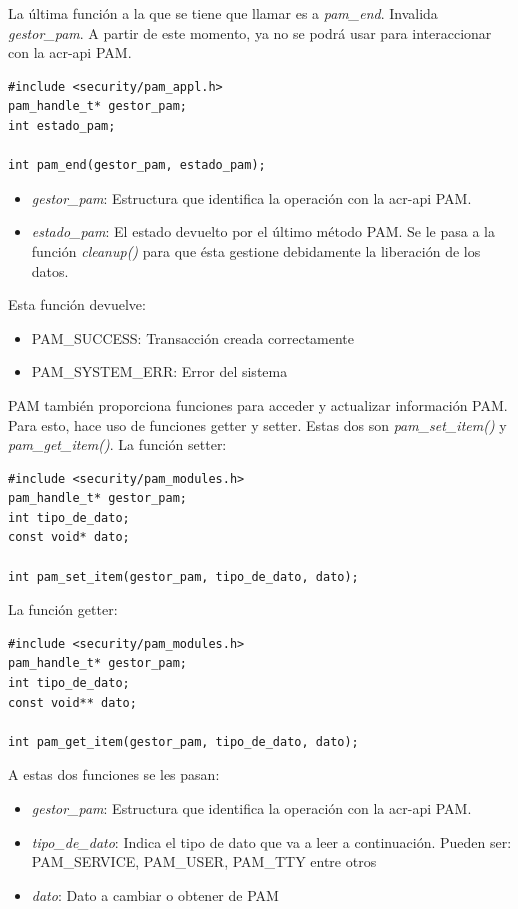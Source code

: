 \documentclass[twoside, titlepage, 12pt, a4paper]{article}
\begin{document}
La última función a la que se tiene que llamar es a \textit{pam\_end}. Invalida \textit{gestor\_pam}. A partir de este momento, ya no se podrá usar para interaccionar con la \gls{acr-api} PAM.
\begin{lstlisting}
#include <security/pam_appl.h>
pam_handle_t* gestor_pam;
int estado_pam;

int pam_end(gestor_pam, estado_pam);
\end{lstlisting}
\begin{itemize}
	\item{\textit{gestor\_pam}: Estructura que identifica la operación con la \gls{acr-api} PAM.}
	\item{\textit{estado\_pam}: El estado devuelto por el último método PAM. Se le pasa a la función \textit{cleanup()} para que ésta gestione debidamente la liberación de los datos.}
\end{itemize}
Esta función devuelve:
\begin{itemize}
	\item{PAM\_SUCCESS: Transacción creada correctamente}
	\item{PAM\_SYSTEM\_ERR: Error del sistema}
\end{itemize} \par
PAM también proporciona funciones para acceder y actualizar información PAM. Para esto, hace uso de funciones getter y setter. Estas dos son \textit{pam\_set\_item()} y \textit{pam\_get\_item()}.
La función setter:
\begin{lstlisting}
#include <security/pam_modules.h>
pam_handle_t* gestor_pam;
int tipo_de_dato;
const void* dato;

int pam_set_item(gestor_pam, tipo_de_dato, dato);
\end{lstlisting}
La función getter:
\begin{lstlisting}
#include <security/pam_modules.h>
pam_handle_t* gestor_pam;
int tipo_de_dato;
const void** dato;

int pam_get_item(gestor_pam, tipo_de_dato, dato);
\end{lstlisting}
A estas dos funciones se les pasan:
\begin{itemize}
	\item{\textit{gestor\_pam}: Estructura que identifica la operación con la \gls{acr-api} PAM.}
	\item{\textit{tipo\_de\_dato}: Indica el tipo de dato que va a leer a continuación. Pueden ser: PAM\_SERVICE, PAM\_USER, PAM\_TTY entre otros}
	\item{\textit{dato}: Dato a cambiar o obtener de PAM}
\end{itemize}
\end{document}
